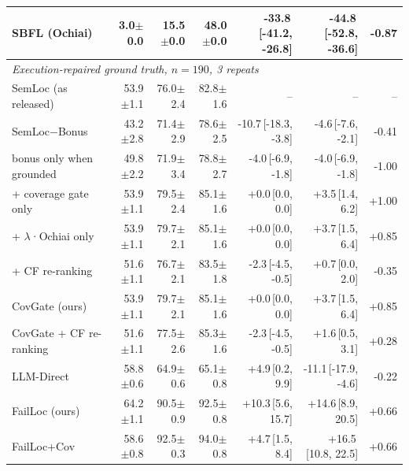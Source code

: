 \begin{tabular}{lrrrrrr}
SBFL (Ochiai) & 3.0{\scriptsize$\pm$0.0} & 15.5{\scriptsize$\pm$0.0} & 48.0{\scriptsize$\pm$0.0} & -33.8{\scriptsize\,[-41.2, -26.8]} & -44.8{\scriptsize\,[-52.8, -36.6]} & -0.87 \\
\midrule
\multicolumn{7}{l}{\emph{Execution-repaired ground truth, $n=190$, 3 repeats}} \\
SemLoc (as released) & 53.9{\scriptsize$\pm$1.1} & 76.0{\scriptsize$\pm$2.4} & 82.8{\scriptsize$\pm$1.6} & -- & -- & -- \\
SemLoc−Bonus & 43.2{\scriptsize$\pm$2.8} & 71.4{\scriptsize$\pm$2.9} & 78.6{\scriptsize$\pm$2.5} & -10.7{\scriptsize\,[-18.3, -3.8]} & -4.6{\scriptsize\,[-7.6, -2.1]} & -0.41 \\
\quad bonus only when grounded & 49.8{\scriptsize$\pm$2.2} & 71.9{\scriptsize$\pm$3.4} & 78.8{\scriptsize$\pm$2.7} & -4.0{\scriptsize\,[-6.9, -1.8]} & -4.0{\scriptsize\,[-6.9, -1.8]} & -1.00 \\
\quad + coverage gate only & 53.9{\scriptsize$\pm$1.1} & 79.5{\scriptsize$\pm$2.4} & 85.1{\scriptsize$\pm$1.6} & +0.0{\scriptsize\,[0.0, 0.0]} & +3.5{\scriptsize\,[1.4, 6.2]} & +1.00 \\
\quad + $\lambda$·Ochiai only & 53.9{\scriptsize$\pm$1.1} & 79.7{\scriptsize$\pm$2.1} & 85.1{\scriptsize$\pm$1.6} & +0.0{\scriptsize\,[0.0, 0.0]} & +3.7{\scriptsize\,[1.5, 6.4]} & +0.85 \\
\quad + CF re-ranking & 51.6{\scriptsize$\pm$1.1} & 76.7{\scriptsize$\pm$2.1} & 83.5{\scriptsize$\pm$1.8} & -2.3{\scriptsize\,[-4.5, -0.5]} & +0.7{\scriptsize\,[0.0, 2.0]} & -0.35 \\
CovGate (ours) & 53.9{\scriptsize$\pm$1.1} & 79.7{\scriptsize$\pm$2.1} & 85.1{\scriptsize$\pm$1.6} & +0.0{\scriptsize\,[0.0, 0.0]} & +3.7{\scriptsize\,[1.5, 6.4]} & +0.85 \\
CovGate + CF re-ranking & 51.6{\scriptsize$\pm$1.1} & 77.5{\scriptsize$\pm$2.6} & 85.3{\scriptsize$\pm$1.6} & -2.3{\scriptsize\,[-4.5, -0.5]} & +1.6{\scriptsize\,[0.5, 3.1]} & +0.28 \\
LLM-Direct & 58.8{\scriptsize$\pm$0.6} & 64.9{\scriptsize$\pm$0.6} & 65.1{\scriptsize$\pm$0.8} & +4.9{\scriptsize\,[0.2, 9.9]} & -11.1{\scriptsize\,[-17.9, -4.6]} & -0.22 \\
FailLoc (ours) & 64.2{\scriptsize$\pm$1.1} & 90.5{\scriptsize$\pm$0.9} & 92.5{\scriptsize$\pm$0.8} & +10.3{\scriptsize\,[5.6, 15.7]} & +14.6{\scriptsize\,[8.9, 20.5]} & +0.66 \\
FailLoc+Cov & 58.6{\scriptsize$\pm$0.8} & 92.5{\scriptsize$\pm$0.3} & 94.0{\scriptsize$\pm$0.8} & +4.7{\scriptsize\,[1.5, 8.4]} & +16.5{\scriptsize\,[10.8, 22.5]} & +0.66 \\

\end{tabular}
